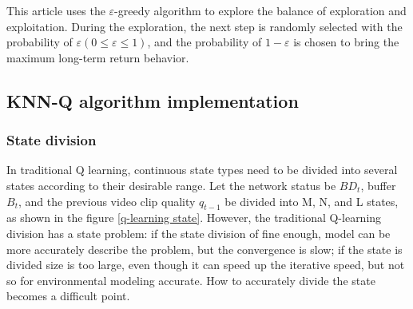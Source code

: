 \documentclass[twocolumn]{article}
\begin{document}
 This article uses the $\varepsilon$-greedy algorithm to explore the balance of exploration and exploitation. 
 During the exploration, the next step is randomly selected with the probability of $\varepsilon(0\leq\varepsilon\leq1)$, 
 and the probability of $1-\varepsilon$ is chosen to bring the maximum long-term return behavior.
 \subsection{KNN-Q algorithm implementation}
 \subsubsection{State division}
 In traditional Q learning, continuous state types need to be divided into 
 several states according to their desirable range.
 Let the network status be $BD_{t}$, buffer $B_{t}$, and the previous video clip quality $q_{t-1}$ 
 be divided into M, N, and L states, as shown in the figure \ref{q-learning state}.
 However, the traditional Q-learning division has a state problem: 
 if the state division of fine enough, model can be more accurately describe the problem, 
 but the convergence is slow; if the state is divided size is too large, 
 even though it can speed up the iterative speed, but not so for environmental modeling accurate. 
 How to accurately divide the state becomes a difficult point.
\end{document}
